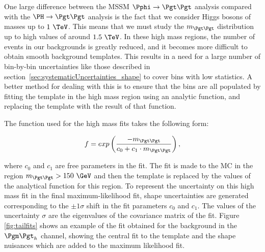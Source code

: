 One large difference between the \ac{MSSM} $\Pphi\to\Pgt\Pgt$ analysis compared
with the $\HToTauTau$ analysis is the fact that we consider Higgs bosons of
masses up to $1~\TeV$. This means that we must study the $m_{\Pgt\Pgt}$
distribution up to high values of around $1.5~\TeV$. In these high mass regions, the
number of events in our backgrounds is greatly reduced, and it becomes more
difficult to obtain smooth background templates. This results in a need for a
large number of bin-by-bin uncertainties like those described in
section~\ref{sec:systematicUncertainties_shape} to cover bins with low
statistics. A better method for dealing with this is to ensure that the bins are
all populated by fitting the template in the high mass region using an analytic
function, and replacing the template with the result of that function.

The function used for the high mass fits takes the following form:

\begin{equation}
f = exp\left(\frac{-m_{\Pgt\Pgt}}{c_{0} + c_{1}\cdot m_{\Pgt\Pgt}}\right) ,
\end{equation}

where $c_{0}$ and $c_{1}$ are free parameters in the fit. The fit is made to
the \ac{MC} in the region $m_{\Pgt\Pgt} > 150~\GeV$ and then the template is
replaced by the values of the analytical function for this region. To represent
the uncertainty on this high mass fit in the final maximum-likelihood fit, shape
uncertainties are generated corresponding to the $\pm1\sigma$ shift in the fit
parameters $c_{0}$ and $c_{1}$. The values of the uncertainty $\sigma$ are the 
eigenvalues of the covariance matrix of the fit. Figure \ref{fig:tailfits} shows
an example of the fit obtained for the \WJets background in the $\mutau$
channel, showing the central fit to the template and the shape nuisances which
are added to the maximum likelihood fit.

